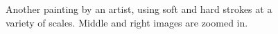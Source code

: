 \documentclass[review]{acmsiggraph}
\begin{document}
\begin{figure}
    \centering
    \caption{Another painting by an artist, using soft and hard strokes at a variety of scales.  Middle and right images are zoomed in.}
    \label{fig:stop}
\end{figure}
\end{document}
